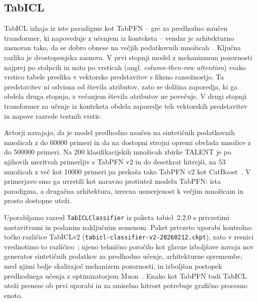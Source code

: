 \documentclass[a4paper,12pt,openright]{book}
\begin{document}
\subsection{TabICL}
\label{sec:tabicl}

TabICL izhaja iz iste paradigme kot TabPFN -- gre za predhodno naučen
transformer, ki napoveduje z učenjem iz konteksta -- vendar je arhitekturno
zasnovan tako, da se dobro obnese na večjih podatkovnih
množicah~\cite{qu2025tabicl}. Ključna razlika je dvostopenjska zasnova. V prvi
stopnji model z mehanizmom pozornosti najprej po stolpcih in nato po vrsticah
(angl. \emph{column-then-row attention}) vsako vrstico tabele preslika v
vektorsko predstavitev s fiksno razsežnostjo. Ta predstavitev ni odvisna od
števila atributov, zato se dolžina zaporedja, ki ga obdela druga stopnja, z
večanjem števila atributov ne povečuje. V drugi stopnji transformer za učenje iz
konteksta obdela zaporedje teh vektorskih predstavitev in napove razrede testnih
vrstic.

Avtorji navajajo, da je model predhodno naučen na sintetičnih podatkovnih
množicah z do \num{60000} primeri in da na dostopni strojni opremi obvlada
množice z do \num{500000} primeri. Na 200 klasifikacijskih množicah zbirke
TALENT je po njihovih meritvah primerljiv s TabPFN v2 in do desetkrat hitrejši,
na 53 množicah z več kot \num{10000} primeri pa prekaša tako TabPFN v2 kot
CatBoost~\cite{qu2025tabicl}. V primerjavo smo ga uvrstili kot naravno protiutež
modelu TabPFN: ista paradigma, a drugačna arhitektura, izrecna usmerjenost k
večjim množicam in prosto dostopne uteži.

Uporabljamo razred \texttt{TabICLClassifier} iz paketa tabicl~2.2.0 s privzetimi
nastavitvami in podanim naključnim semenom. Paket privzeto uporabi kontrolno
točko različice TabICLv2 (\texttt{tabicl-classifier-v2-20260212.ckpt}), zato v
resnici vrednotimo to različico~\cite{tabicldocs}; njeno tehnično poročilo kot
glavne izboljšave navaja nov generator sintetičnih podatkov za predhodno učenje,
arhitekturne spremembe, med njimi bolje skalirajoč mehanizem pozornosti, in
izboljšan postopek predhodnega učenja z optimizatorjem
Muon~\cite{qu2026tabiclv2}.
Enako kot TabPFN tudi TabICL uteži prenese ob prvi uporabi in za smiselno hitrost potrebuje grafično procesno enoto.
\end{document}
